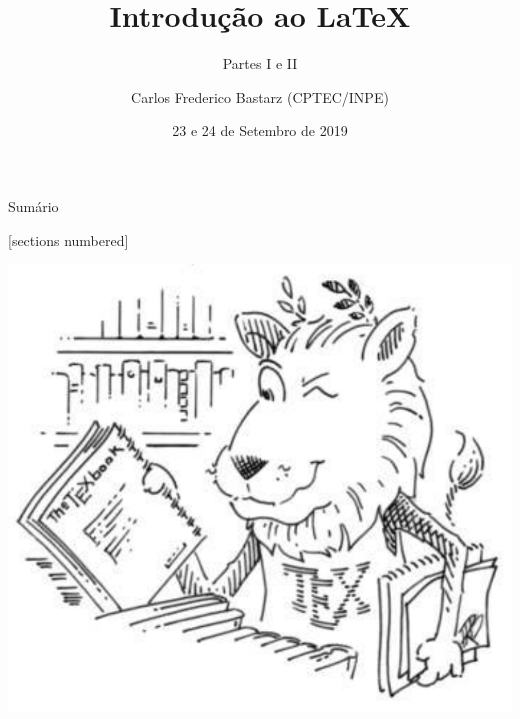 \documentclass[10pt]{beamer}
\title{Introdução ao \LaTeX}
\subtitle{Partes I e II}
\date{23 e 24 de Setembro de 2019}
\author{Carlos Frederico Bastarz (CPTEC/INPE)}
\institute{Instituto Nacional de Pesquisas Espaciais (INPE)}
\begin{document}
\maketitle



\begin{frame}[c]{Sumário}
    \vspace{2em}
    \begin{multicols}{2}
        \begin{minipage}{0.49\textwidth}
           [sections numbered]
           \tableofcontents[hideallsubsections]
        \end{minipage}
        \begin{minipage}{0.49\textwidth}
            \includegraphics[width=\textwidth]{./figs/ctan_lion_350x350.pdf}
        \end{minipage}
    \end{multicols}
\end{frame}
\end{document}
